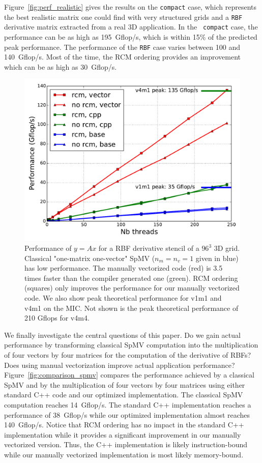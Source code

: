 \documentclass{sig-alternate}
\begin{document}
Figure~\ref{fig:perf_realistic} gives the results on the {\tt compact}
case, which represents the best realistic matrix one could find with very
structured grids and a
{\tt RBF} derivative matrix extracted from a real 3D application. In the {\tt
  compact} case, the performance can be as high as 195~Gflop/s, which is
within 15\% of the predicted  peak performance. The performance of the
{\tt RBF} case varies between 100 and 140~Gflop/s. Most of the
time, the RCM ordering provides an improvement which can be as high as
30~Gflop/s.

\begin{figure}[h]
  \centering 
  
  \includegraphics[width=.9\linewidth]{figures/mic_performance_nb_threads.pdf}

  \caption{Performance of $y=Ax$ for a RBF derivative stencil of a
    $96^3$ 3D grid. Classical "one-matrix one-vector" SpMV ($n_m=n_v=1$ given in blue) has low
    performance. The manually vectorized code (red) is 3.5 times
    faster than the compiler generated one (green). RCM ordering
    (squares) only improves the performance for our manually
    vectorized code.
    We also show peak theoretical performance for v1m1 and v4m1 on the MIC. 
    Not shown is the peak theoretical performance of 210 Gflops for v4m4. 
    }
  \label{fig:comparison_spmv}
  \label{fig:perf_mic}
\end{figure}

We finally investigate the central questions of this paper. Do we gain
actual performance by transforming classical SpMV computation into the
multiplication of four vectors by four matrices for the computation of the
derivative of RBFs? Does using manual vectorization improve actual
application performance? Figure~\ref{fig:comparison_spmv} compares the
performance achieved by a classical SpMV and by the multiplication of
four vectors by four matrices using either standard C++ code and our
optimized implementation. The
classical SpMV computation reaches 14~Gflop/s. 
The standard C++ implementation reaches a performance of 38~Gflop/s while our
optimized implementation almost reaches 140~Gflop/s. 
Notice that 
RCM ordering has no impact in the standard C++ implementation while it
provides a significant improvement in our manually vectorized
version. Thus, the C++ implementation is likely instruction-bound
while our manually vectorized implementation is most likely 
memory-bound. 
\end{document}
